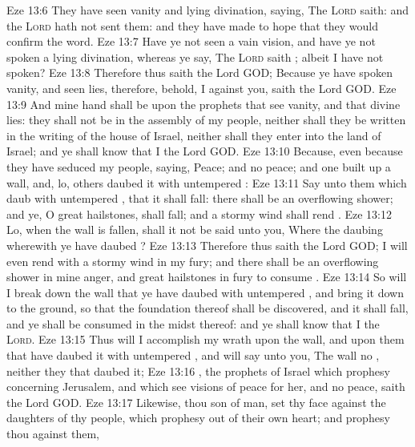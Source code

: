 \vs Eze 13:6 They have seen vanity and lying divination, saying, The \textsc{Lord} saith: and the \textsc{Lord} hath not sent them: and they have made  to hope that they would confirm the word.
\vs Eze 13:7 Have ye not seen a vain vision, and have ye not spoken a lying divination, whereas ye say, The \textsc{Lord} saith ; albeit I have not spoken?
\vs Eze 13:8 Therefore thus saith the Lord GOD; Because ye have spoken vanity, and seen lies, therefore, behold, I  against you, saith the Lord GOD.
\vs Eze 13:9 And mine hand shall be upon the prophets that see vanity, and that divine lies: they shall not be in the assembly of my people, neither shall they be written in the writing of the house of Israel, neither shall they enter into the land of Israel; and ye shall know that I  the Lord GOD.
\vs Eze 13:10 Because, even because they have seduced my people, saying, Peace; and  no peace; and one built up a wall, and, lo, others daubed it with untempered :
\vs Eze 13:11 Say unto them which daub  with untempered , that it shall fall: there shall be an overflowing shower; and ye, O great hailstones, shall fall; and a stormy wind shall rend .
\vs Eze 13:12 Lo, when the wall is fallen, shall it not be said unto you, Where  the daubing wherewith ye have daubed ?
\vs Eze 13:13 Therefore thus saith the Lord GOD; I will even rend  with a stormy wind in my fury; and there shall be an overflowing shower in mine anger, and great hailstones in  fury to consume .
\vs Eze 13:14 So will I break down the wall that ye have daubed with untempered , and bring it down to the ground, so that the foundation thereof shall be discovered, and it shall fall, and ye shall be consumed in the midst thereof: and ye shall know that I  the \textsc{Lord}.
\vs Eze 13:15 Thus will I accomplish my wrath upon the wall, and upon them that have daubed it with untempered , and will say unto you, The wall  no , neither they that daubed it;
\vs Eze 13:16 , the prophets of Israel which prophesy concerning Jerusalem, and which see visions of peace for her, and  no peace, saith the Lord GOD.
\vs Eze 13:17 Likewise, thou son of man, set thy face against the daughters of thy people, which prophesy out of their own heart; and prophesy thou against them,
